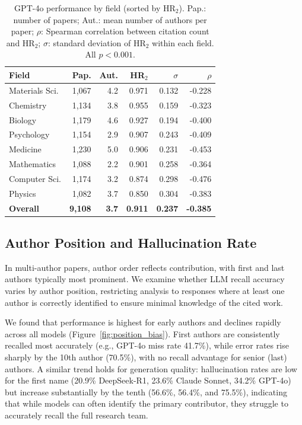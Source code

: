 \documentclass[11pt]{article}
\begin{document}
\begin{table}[htbp]
\setlength{\tabcolsep}{3pt}
  \centering

  \begin{tabular}{@{}lrrrrr@{}}
    \toprule
    \textbf{Field} & \textbf{Pap.} & \textbf{Aut.} & \textbf{HR$_2$} & $\sigma$ & $\rho$ \\
    \midrule
    Materials Sci. & 1,067 & 4.2 & 0.971 & 0.132 & -0.228 \\
    Chemistry & 1,134 & 3.8 & 0.955 & 0.159 & -0.323 \\
    Biology & 1,179 & 4.6 & 0.927 & 0.194 & -0.400 \\
    Psychology & 1,154 & 2.9 & 0.907 & 0.243 & -0.409 \\
    Medicine & 1,230 & 5.0 & 0.906 & 0.231 & -0.453 \\
    Mathematics & 1,088 & 2.2 & 0.901 & 0.258 & -0.364 \\
    Computer Sci. & 1,174 & 3.2 & 0.874 & 0.298 & -0.476 \\
    Physics & 1,082 & 3.7 & 0.850 & 0.304 & -0.383 \\
    \midrule
    \textbf{Overall} & \textbf{9,108} & \textbf{3.7} & \textbf{0.911} & \textbf{0.237} & \textbf{-0.385} \\
    \bottomrule
  \end{tabular}
    \caption{GPT-4o performance by field (sorted by HR$_2$). Pap.: number of papers; Aut.: mean number of authors per paper; $\rho$: Spearman correlation between citation count and HR$_2$; $\sigma$: standard deviation of HR$_2$ within each field. All $p < 0.001$.}
  \label{tab:detailed_gpt_4o}
\end{table}

\subsection{Author Position and Hallucination Rate}
\label{sec:author_position_hallucination}

In multi-author papers, author order reflects contribution, with first and last authors typically most prominent. We examine whether LLM recall accuracy varies by author position, restricting analysis to responses where at least one author is correctly identified to ensure minimal knowledge of the cited work.

We found that performance is highest for early authors and declines rapidly across all models (Figure~\ref{fig:position_bias}). First authors are consistently recalled most accurately (e.g., GPT-4o miss rate 41.7\%), while error rates rise sharply by the 10th author (70.5\%), with no recall advantage for senior (last) authors. A similar trend holds for generation quality: hallucination rates are low for the first name (20.9\% DeepSeek-R1, 23.6\% Claude Sonnet, 34.2\% GPT-4o) but increase substantially by the tenth (56.6\%, 56.4\%, and 75.5\%), indicating that while models can often identify the primary contributor, they struggle to accurately recall the full research team.
\end{document}
